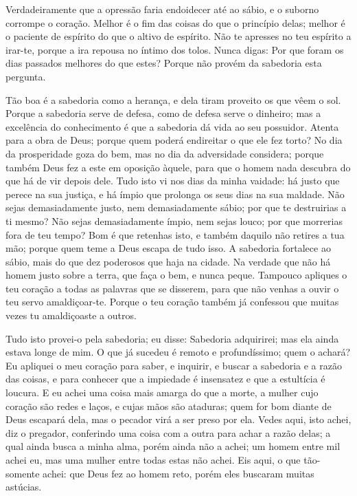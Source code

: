 Verdadeiramente que a opressão faria endoidecer até ao sábio, e o
suborno corrompe o coração. Melhor é o fim das coisas do que o
princípio delas; melhor é o paciente de espírito do que o altivo de
espírito. Não te apresses no teu espírito a irar-te, porque a
ira repousa no íntimo dos tolos. Nunca digas: Por que foram
os dias passados melhores do que estes? Porque não provém da
sabedoria esta pergunta.

Tão boa é a sabedoria como a herança, e dela tiram proveito os
que vêem o sol. Porque a sabedoria serve de defesa, como de
defesa serve o dinheiro; mas a excelência do conhecimento é que a
sabedoria dá vida ao seu possuidor. Atenta para a obra de
Deus; porque quem poderá endireitar o que ele fez torto? No
dia da prosperidade goza do bem, mas no dia da adversidade
considera; porque também Deus fez a este em oposição àquele, para
que o homem nada descubra do que há de vir depois dele. Tudo
isto vi nos dias da minha vaidade: há justo que perece na sua
justiça, e há ímpio que prolonga os seus dias na sua maldade.
Não sejas demasiadamente justo, nem demasiadamente sábio; por
que te destruirias a ti mesmo? Não sejas demasiadamente
ímpio, nem sejas louco; por que morrerias fora de teu tempo?
Bom é que retenhas isto, e também daquilo não retires a tua
mão; porque quem teme a Deus escapa de tudo isso. A sabedoria
fortalece ao sábio, mais do que dez poderosos que haja na cidade.
Na verdade que não há homem justo sobre a terra, que faça o
bem, e nunca peque. Tampouco apliques o teu coração a todas
as palavras que se disserem, para que não venhas a ouvir o teu servo
amaldiçoar-te. Porque o teu coração também já confessou que
muitas vezes tu amaldiçoaste a outros.

Tudo isto provei-o pela sabedoria; eu disse: Sabedoria
adquirirei; mas ela ainda estava longe de mim. O que já
sucedeu é remoto e profundíssimo; quem o achará? Eu apliquei
o meu coração para saber, e inquirir, e buscar a sabedoria e a razão
das coisas, e para conhecer que a impiedade é insensatez e que a
estultícia é loucura. E eu achei uma coisa mais amarga do que
a morte, a mulher cujo coração são redes e laços, e cujas mãos são
ataduras; quem for bom diante de Deus escapará dela, mas o pecador
virá a ser preso por ela. Vedes aqui, isto achei, diz o
pregador, conferindo uma coisa com a outra para achar a razão delas;
a qual ainda busca a minha alma, porém ainda não a achei; um
homem entre mil achei eu, mas uma mulher entre todas estas não
achei. Eis aqui, o que tão-somente achei: que Deus fez ao
homem reto, porém eles buscaram muitas astúcias.

